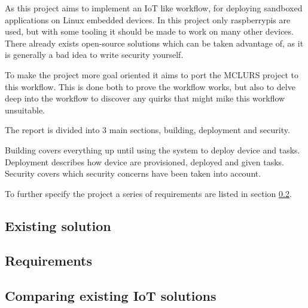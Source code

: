 \documentclass[../../main.tex]{subfiles}
\begin{document}
As this project aims to implement an IoT like workflow, for deploying sandboxed applications
on Linux embedded devices. In this project only raspberrypis are used, but with some
tooling it should be made to work on many other devices.\\

There already exists open-source solutions which can be taken advantage of, as it is generally a bad
idea to write security yourself.

To make the project more goal oriented it aims to port the MCLURS project to this workflow.
This is done both to prove the workflow works, but also to delve deep into the workflow
to discover any quirks that might mike this workflow unsuitable.

The report is divided into 3 main sections, building, deployment and security.

Building covers everything up until using the system to deploy device and tasks.
Deployment describes how device are provisioned, deployed and given tasks.
Security covers which security concerns have been taken into account.

To further specify the project a series of requirements are listed in section \ref{sub:requirements}.


\subsection{Existing solution}%
\label{sub:existing_solution}


\subsection{Requirements}%
\label{sub:requirements}


\subsection{Comparing existing IoT solutions}%
\label{sub:comparing_existing_iot_solutions}

	
\end{document}
